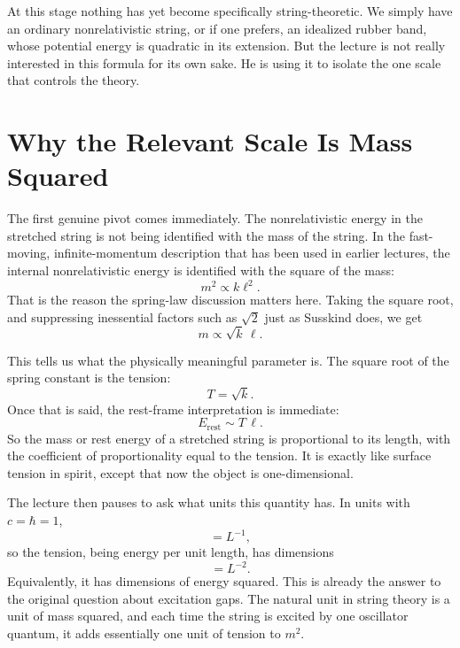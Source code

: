 At this stage nothing has yet become specifically string-theoretic. We simply have an ordinary nonrelativistic string, or if one prefers, an idealized rubber band, whose potential energy is quadratic in its extension. But the lecture is not really interested in this formula for its own sake. He is using it to isolate the one scale that controls the theory.

\section{Why the Relevant Scale Is Mass Squared}

The first genuine pivot comes immediately. The nonrelativistic energy in the stretched string is not being identified with the mass of the string. In the fast-moving, infinite-momentum description that has been used in earlier lectures, the internal nonrelativistic energy is identified with the square of the mass:
\begin{equation}
m^{2}\propto k\ell^{2}.
\end{equation}
That is the reason the spring-law discussion matters here. Taking the square root, and suppressing inessential factors such as \(\sqrt{2}\) just as Susskind does, we get
\begin{equation}
m\propto \sqrt{k}\,\ell.
\end{equation}

This tells us what the physically meaningful parameter is. The square root of the spring constant is the tension:
\begin{equation}
T=\sqrt{k}.
\end{equation}
Once that is said, the rest-frame interpretation is immediate:
\begin{equation}
E_{\text{rest}}\sim T\,\ell.
\end{equation}
So the mass or rest energy of a stretched string is proportional to its length, with the coefficient of proportionality equal to the tension. It is exactly like surface tension in spirit, except that now the object is one-dimensional.

The lecture then pauses to ask what units this quantity has. In units with \(c=\hbar=1\),
\begin{equation}
[E]=L^{-1},
\end{equation}
so the tension, being energy per unit length, has dimensions
\begin{equation}
[T]=L^{-2}.
\end{equation}
Equivalently, it has dimensions of energy squared. This is already the answer to the original question about excitation gaps. The natural unit in string theory is a unit of mass squared, and each time the string is excited by one oscillator quantum, it adds essentially one unit of tension to \(m^{2}\).


